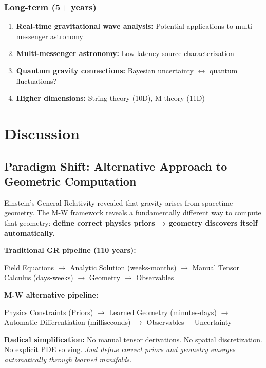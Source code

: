 \documentclass[11pt,a4paper]{article}
\begin{document}
\subsubsection{Long-term (5+ years)}

\begin{enumerate}
\item \textbf{Real-time gravitational wave analysis:} Potential applications to multi-messenger astronomy
\item \textbf{Multi-messenger astronomy:} Low-latency source characterization
\item \textbf{Quantum gravity connections:} Bayesian uncertainty $\leftrightarrow$ quantum fluctuations?
\item \textbf{Higher dimensions:} String theory (10D), M-theory (11D)
\end{enumerate}

\section{Discussion}

\subsection{Paradigm Shift: Alternative Approach to Geometric Computation}

Einstein's General Relativity revealed that gravity arises from spacetime geometry. The M-W framework reveals a fundamentally different way to compute that geometry: \textbf{define correct physics priors → geometry discovers itself automatically.}

\textbf{Traditional GR pipeline (110 years):}
\begin{center}
Field Equations $\to$ Analytic Solution (weeks-months) $\to$ Manual Tensor Calculus (days-weeks) $\to$ Geometry $\to$ Observables
\end{center}

\textbf{M-W alternative pipeline:}
\begin{center}
Physics Constraints (Priors) $\to$ Learned Geometry (minutes-days) $\to$ Automatic Differentiation (milliseconds) $\to$ Observables + Uncertainty
\end{center}

\textbf{Radical simplification:} No manual tensor derivations. No spatial discretization. No explicit PDE solving. \emph{Just define correct priors and geometry emerges automatically through learned manifolds.}
\end{document}
